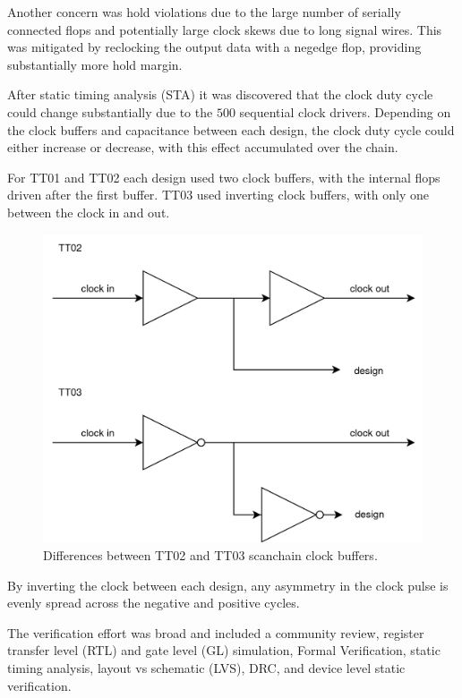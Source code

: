 Another concern was hold violations due to the large number of serially connected flops and potentially large clock skews due to long signal wires.  This was mitigated by reclocking the output data with a negedge flop, providing substantially more hold margin.

After static timing analysis (STA) it was discovered that the clock duty cycle could change substantially due to the \(500\) sequential clock drivers. Depending on the clock buffers and capacitance between each design, the clock duty cycle could either increase or decrease, with this effect accumulated over the chain.

For TT01 and TT02 each design used two clock buffers, with the internal flops driven after the first buffer.
TT03 used inverting clock buffers, with only one between the clock in and out.

\begin{figure}[htp]
\centering
\includegraphics[width=\columnwidth]{./Figs/tt02 vs tt03 scanchain clock.png}
\caption{Differences between TT02 and TT03 scanchain clock buffers.}
\label{fig:TT02_vs_TT03}
\end{figure}

By inverting the clock between each design, any asymmetry in the clock pulse is evenly spread across the negative and positive cycles.

The verification effort\cite{verificationmd} was broad and included a community review, register transfer level (RTL) and gate level (GL) simulation, Formal Verification\cite{sby}, static timing analysis, layout vs schematic (LVS), DRC, and device level static verification\cite{cvc}.
